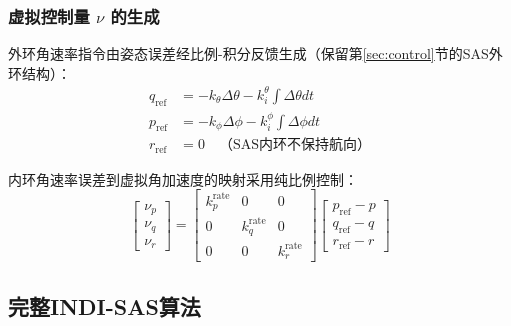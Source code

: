 \subsubsection{虚拟控制量 $\nu$ 的生成}

外环角速率指令由姿态误差经比例-积分反馈生成（保留第\ref{sec:control}节的SAS外环结构）：
\begin{align}
    q_{\text{ref}} &= -k_\theta\Delta\theta - k_i^\theta\int\Delta\theta dt \label{eq:indi_outer_pitch} \\
    p_{\text{ref}} &= -k_\phi\Delta\phi - k_i^\phi\int\Delta\phi dt \label{eq:indi_outer_roll} \\
    r_{\text{ref}} &= 0 \quad\text{（SAS内环不保持航向）} \label{eq:indi_outer_yaw}
\end{align}

内环角速率误差到虚拟角加速度的映射采用纯比例控制：
\begin{equation}
    \begin{bmatrix} \nu_p \\ \nu_q \\ \nu_r \end{bmatrix}
    =
    \begin{bmatrix} k_p^{\text{rate}} & 0 & 0 \\ 0 & k_q^{\text{rate}} & 0 \\ 0 & 0 & k_r^{\text{rate}} \end{bmatrix}
    \begin{bmatrix} p_{\text{ref}} - p \\ q_{\text{ref}} - q \\ r_{\text{ref}} - r \end{bmatrix}
    \label{eq:indi_nu}
\end{equation}

\subsection{完整INDI-SAS算法}
\label{sec:indi_algorithm}

